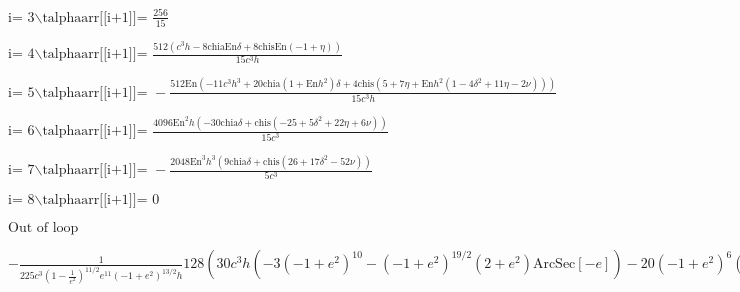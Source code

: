 \documentclass{article}
\begin{document}
\noindent\(\text{i= }3\text{$\backslash $talphaarr[[i+1]]= }\frac{256}{15}\)

\noindent\(\text{i= }4\text{$\backslash $talphaarr[[i+1]]= }\frac{512 \left(c^3 h-8 \text{chia} \text{En} \delta +8 \text{chis} \text{En} (-1+\eta
)\right)}{15 c^3 h}\)

\noindent\(\text{i= }5\text{$\backslash $talphaarr[[i+1]]= }-\frac{512 \text{En} \left(-11 c^3 h^3+20 \text{chia} \left(1+\text{En} h^2\right) \delta
+4 \text{chis} \left(5+7 \eta +\text{En} h^2 \left(1-4 \delta ^2+11 \eta -2 \nu \right)\right)\right)}{15 c^3 h}\)

\noindent\(\text{i= }6\text{$\backslash $talphaarr[[i+1]]= }\frac{4096 \text{En}^2 h \left(-30 \text{chia} \delta +\text{chis} \left(-25+5 \delta
^2+22 \eta +6 \nu \right)\right)}{15 c^3}\)

\noindent\(\text{i= }7\text{$\backslash $talphaarr[[i+1]]= }-\frac{2048 \text{En}^3 h^3 \left(9 \text{chia} \delta +\text{chis} \left(26+17 \delta
^2-52 \nu \right)\right)}{5 c^3}\)

\noindent\(\text{i= }8\text{$\backslash $talphaarr[[i+1]]= }0\)

\noindent\(\text{Out of loop}\)

\begin{doublespace}
\noindent\(-\frac{1}{225 c^3 \left(1-\frac{1}{e^2}\right)^{11/2} e^{11} \left(-1+e^2\right)^{13/2} h}128 \left(30 c^3 h \left(-3 \left(-1+e^2\right)^{10}-\left(-1+e^2\right)^{19/2}
\left(2+e^2\right) \text{ArcSec}[-e]\right)-20 \left(-1+e^2\right)^6 \left(c^3 h-8 \text{chia} \text{En} \delta +8 \text{chis} \text{En} (-1+\eta
)\right) \left(\left(-1+e^2\right)^3 \left(11+4 e^2\right)+3 \left(-1+e^2\right)^{5/2} \left(2+3 e^2\right) \text{ArcSec}[-e]\right)-8 \left(-1+e^2\right)^2
\text{En}^2 h^2 \left(-30 \text{chia} \delta +\text{chis} \left(-25+5 \delta ^2+22 \eta +6 \nu \right)\right) \left(\left(-1+e^2\right)^5 \left(274+607
e^2+64 e^4\right)+15 \left(-1+e^2\right)^{9/2} \left(8+40 e^2+15 e^4\right) \text{ArcSec}[-e]\right)+5 \left(-1+e^2\right)^4 \text{En} \left(-11
c^3 h^3+20 \text{chia} \left(1+\text{En} h^2\right) \delta +4 \text{chis} \left(5+7 \eta +\text{En} h^2 \left(1-4 \delta ^2+11 \eta -2 \nu \right)\right)\right)
\left(5 \left(-1+e^2\right)^4 \left(10+11 e^2\right)+3 \left(-1+e^2\right)^{7/2} \left(8+3 e^2 \left(8+e^2\right)\right) \text{ArcSec}[-e]\right)+18
\text{En}^3 h^4 \left(9 \text{chia} \delta +\text{chis} \left(26+17 \delta ^2-52 \nu \right)\right) \left(7 \left(-1+e^2\right)^6 \left(28+104 e^2+33
e^4\right)+5 \left(-1+e^2\right)^{11/2} \left(16+5 e^2 \left(24+18 e^2+e^4\right)\right) \text{ArcSec}[-e]\right)\right)\)
\end{doublespace}
\end{document}
